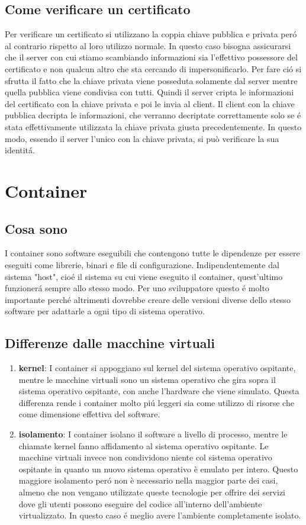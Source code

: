 \subsection{Come verificare un certificato}
Per verificare un certificato si utilizzano la coppia chiave pubblica e privata peró al contrario rispetto al loro utilizzo normale. In questo caso bisogna assicurarsi che il server con cui stiamo scambiando informazioni sia l'effettivo possessore del certificato e non qualcun altro che sta cercando di impersonificarlo. Per fare ció si sfrutta il fatto che la chiave privata viene posseduta solamente dal server mentre quella pubblica viene condivisa con tutti. Quindi il server cripta le informazioni del certificato con la chiave privata e poi le invia al client. Il client con la chiave pubblica decripta le informazioni, che verranno decriptate correttamente solo se é stata effettivamente utilizzata la chiave privata giusta precedentemente. In questo modo, essendo il server l'unico con la chiave privata, si può verificare la sua identitá.

\section{Container}
\subsection{Cosa sono}
\cite{container}I container sono software eseguibili che contengono tutte le dipendenze per essere eseguiti come librerie, binari e file di configurazione. Indipendentemente dal sistema "host", cioé il sistema su cui viene eseguito il container, quest'ultimo funzionerá sempre allo stesso modo. Per uno sviluppatore questo é molto importante perché altrimenti dovrebbe creare delle versioni diverse dello stesso software per adattarle a ogni tipo di sistema operativo.
\subsection{Differenze dalle macchine virtuali}
\begin{enumerate}
  \item \textbf{kernel}: I container si appoggiano sul kernel del sistema operativo ospitante, mentre le macchine virtuali sono un sistema operativo che gira sopra il sistema operativo ospitante, con anche l'hardware che viene simulato. Questa differenza rende i container molto piú leggeri sia come utilizzo di risorse che come dimensione effettiva del software.
  \item \textbf{isolamento}: I container isolano il software a livello di processo, mentre le chiamate kernel fanno affidamento al sistema operativo ospitante. Le macchine virtuali invece non condividono niente col sistema operativo ospitante in quanto un nuovo sistema operativo è emulato per intero. Questo maggiore isolamento peró non è necessario nella maggior parte dei casi, almeno che non vengano utilizzate queste tecnologie per offrire dei servizi dove gli utenti possono eseguire del codice all'interno dell'ambiente virtualizzato. In questo caso é meglio avere l'ambiente completamente isolato.
\end{enumerate}

